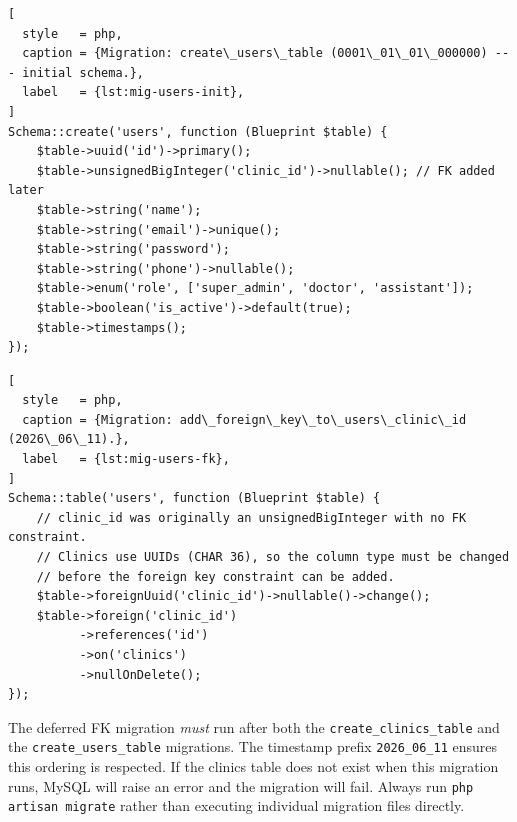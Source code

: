 \begin{lstlisting}[
  style   = php,
  caption = {Migration: create\_users\_table (0001\_01\_01\_000000) --- initial schema.},
  label   = {lst:mig-users-init},
]
Schema::create('users', function (Blueprint $table) {
    $table->uuid('id')->primary();
    $table->unsignedBigInteger('clinic_id')->nullable(); // FK added later
    $table->string('name');
    $table->string('email')->unique();
    $table->string('password');
    $table->string('phone')->nullable();
    $table->enum('role', ['super_admin', 'doctor', 'assistant']);
    $table->boolean('is_active')->default(true);
    $table->timestamps();
});
\end{lstlisting}

\begin{lstlisting}[
  style   = php,
  caption = {Migration: add\_foreign\_key\_to\_users\_clinic\_id (2026\_06\_11).},
  label   = {lst:mig-users-fk},
]
Schema::table('users', function (Blueprint $table) {
    // clinic_id was originally an unsignedBigInteger with no FK constraint.
    // Clinics use UUIDs (CHAR 36), so the column type must be changed
    // before the foreign key constraint can be added.
    $table->foreignUuid('clinic_id')->nullable()->change();
    $table->foreign('clinic_id')
          ->references('id')
          ->on('clinics')
          ->nullOnDelete();
});
\end{lstlisting}

\begin{warningbox}
  The deferred FK migration \emph{must} run after both the
  \texttt{create\_clinics\_table} and the \texttt{create\_users\_table}
  migrations. The timestamp prefix \texttt{2026\_06\_11} ensures this
  ordering is respected. If the clinics table does not exist when this
  migration runs, MySQL will raise an error and the migration will fail.
  Always run \texttt{php artisan migrate} rather than executing
  individual migration files directly.
\end{warningbox}

